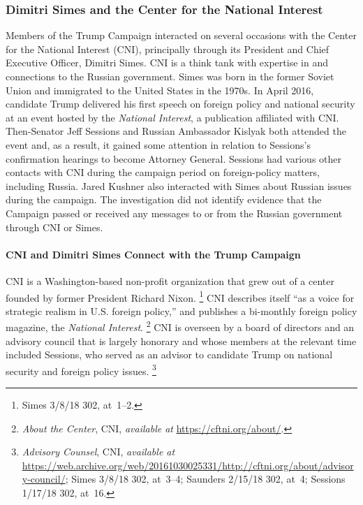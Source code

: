 \subsubsection{Dimitri Simes and the Center for the National Interest}

Members of the Trump Campaign interacted on several occasions with the Center for the National Interest (CNI), principally through its President and Chief Executive Officer, Dimitri Simes.
CNI is a think tank with expertise in and connections to the Russian government.
Simes was born in the former Soviet Union and immigrated to the United States in the 1970s.
In April 2016, candidate Trump delivered his first speech on foreign policy and national security at an event hosted by the \textit{National Interest}, a publication affiliated with CNI\null.
Then-Senator Jeff Sessions and Russian Ambassador Kislyak both attended the event and, as a result, it gained some attention in relation to Sessions's confirmation hearings to become Attorney General.
Sessions had various other contacts with CNI during the campaign period on foreign-policy matters, including Russia.
Jared Kushner also interacted with Simes about Russian issues during the campaign.
The investigation did not identify evidence that the Campaign passed or received any messages to or from the Russian government through CNI or Simes.

\paragraph{CNI and Dimitri Simes Connect with the Trump Campaign}

CNI is a Washington-based non-profit organization that grew out of a center founded by former President Richard Nixon.%
\footnote{Simes 3/8/18 302, at~1--2.}
CNI describes itself ``as a voice for strategic realism in U.S. foreign policy,'' and publishes a bi-monthly foreign policy magazine, the \textit{National Interest}.%
\footnote{\textit{About the Center}, CNI, \textit{available at} \url{https://cftni.org/about/}.}
CNI is overseen by a board of directors and an advisory council that is largely honorary and whose members at the relevant time included Sessions, who served as an advisor to candidate Trump on national security and foreign policy issues.%
\footnote{\textit{Advisory Counsel}, CNI, \textit{available at} \url{https://web.archive.org/web/20161030025331/http://cftni.org/about/advisory-council/};
Simes 3/8/18 302, at~3--4;
Saunders 2/15/18 302, at~4;
Sessions 1/17/18 302, at~16.}

